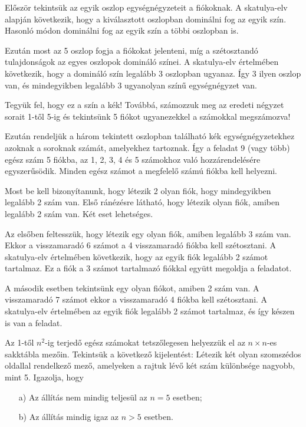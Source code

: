 \begin{solution}
	Először tekintsük az egyik oszlop egységnégyzeteit a fiókoknak. A
	skatulya-elv alapján következik, hogy a kiválasztott oszlopban dominálni
	fog az egyik szín. Hasonló módon dominálni fog az egyik szín a többi
	oszlopban is.
	
	Ezután most az 5 oszlop fogja a fiókokat jelenteni, míg a szétosztandó
	tulajdonságok az egyes oszlopok domináló színei. A skatulya-elv értelmében
	következik, hogy a domináló szín legalább 3 oszlopban ugyanaz. Így
	3 ilyen oszlop van, és mindegyikben legalább 3 ugyanolyan színű egységnégyzet
	van.
	
	Tegyük fel, hogy ez a szín a kék! Továbbá, számozzuk meg az eredeti
	négyzet sorait 1-től 5-ig és tekintsünk 5 fiókot ugyanezekkel a számokkal
	megszámozva!
	
	Ezután rendeljük a három tekintett oszlopban található kék egységnégyzetekhez
	azoknak a soroknak számát, amelyekhez tartoznak. Így a feladat 9 (vagy
	több) egész szám 5 fiókba, az 1, 2, 3, 4 és 5 számokhoz való hozzárendelésére
	egyszerűsödik. Minden egész számot a megfelelő számú fiókba kell helyezni.
	
	Most be kell bizonyítanunk, hogy létezik 2 olyan fiók, hogy mindegyikben
	legalább 2 szám van. Első ránézésre látható, hogy létezik olyan fiók,
	amiben legalább 2 szám van. Két eset lehetséges.
	
	Az elsőben feltesszük, hogy létezik egy olyan fiók, amiben legalább
	3 szám van. Ekkor a visszamaradó 6 számot a 4 visszamaradó fiókba
	kell szétosztani. A skatulya-elv értelmében következik, hogy az egyik
	fiók legalább 2 számot tartalmaz. Ez a fiók a 3 számot tartalmazó
	fiókkal együtt megoldja a feladatot.
	
	A második esetben tekintsünk egy olyan fiókot, amiben 2 szám van.
	A visszamaradó 7 számot ekkor a visszamaradó 4 fiókba kell szétosztani.
	A skatulya-elv értelmében az egyik fiók legalább 2 számot tartalmaz,
	és így készen is van a feladat.
\end{solution}
\begin{extraproblem}
	Az 1-től $n^{2}$-ig terjedő egész számokat tetszőlegesen helyezzük
	el az $n\times n$-es sakktábla mezőin. Tekintsük a következő kijelentést:
	Létezik két olyan szomszédos oldallal rendelkező mező, amelyeken a
	rajtuk lévő két szám különbsége nagyobb, mint 5. Igazolja, hogy
	\begin{itemize}
		\item[\foreignlanguage{english}{a)}] Az állítás nem mindig teljesül az $n=5$ esetben; 
		\item[\foreignlanguage{english}{b)}] Az állítás mindig igaz az $n>5$ esetben. 
	\end{itemize}
\end{extraproblem}

